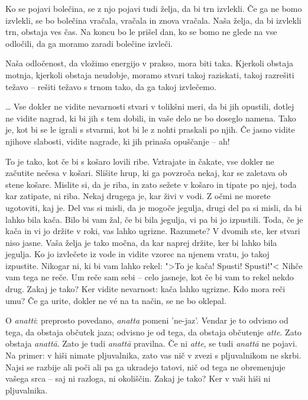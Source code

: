 Ko se pojavi bolečina, se z njo pojavi tudi želja, da bi trn izvlekli. Če ga ne bomo izvlekli, se bo bolečina vračala, vračala in znova vračala. Naša želja, da bi izvlekli trn, obstaja ves čas. Na koncu bo le prišel dan, ko se bomo ne glede na vse odločili, da ga moramo zaradi bolečine izvleči.

Naša odločenost, da vložimo energijo v prakso, mora biti taka. Kjerkoli obstaja motnja, kjerkoli obstaja neudobje, moramo stvari takoj raziskati, takoj razrešiti težavo – rešiti težavo s trnom tako, da ga takoj izvlečemo.

\clearpage


\ldots{} Vse dokler ne vidite nevarnosti stvari v tolikšni meri, da bi jih opustili, dotlej ne vidite nagrad, ki bi jih s tem dobili, in vaše delo ne bo doseglo namena. Tako je, kot bi se le igrali s stvarmi, kot bi le z nohti praskali po njih. Če jasno vidite njihove slabosti, vidite nagrade, ki jih prinaša opuščanje – ah!

To je tako, kot če bi s košaro lovili ribe. Vztrajate in čakate, vse dokler ne začutite nečesa v košari. Slišite hrup, ki ga povzroča nekaj, kar se zaletava ob stene košare. Mislite si, da je riba, in zato sežete v košaro in tipate po njej, toda kar zatipate, ni riba. Nekaj drugega je, kar živi v vodi. Z očmi ne morete ugotoviti, kaj je. Del vas si misli, da je mogoče jegulja, drugi del pa si misli, da bi lahko bila kača. Bilo bi vam žal, če bi bila jegulja, vi pa bi jo izpustili. Toda, če je kača in vi jo držite v roki, vas lahko ugrizne. Razumete? V dvomih ste, ker stvari niso jasne. Vaša želja je tako močna, da kar naprej držite, ker bi lahko bila jegulja. Ko jo izvlečete iz vode in vidite vzorec na njenem vratu, jo takoj izpustite. Nikogar ni, ki bi vam lahko rekel: ">To je kača! Spusti! Spusti!"< Nihče vam tega ne reče. Um reče sam sebi – celo jasneje, kot če bi vam to rekel nekdo drug. Zakaj je tako? Ker vidite nevarnost: kača lahko ugrizne. Kdo mora reči umu? Če ga urite, dokler ne vé na ta način, se ne bo oklepal.

\clearpage


O \emph{anatti}: preprosto povedano, \emph{anatta} pomeni 'ne-jaz'. Vendar je to odvisno od tega, da obstaja občutek jaza; odvisno je od tega, da obstaja občutenje \emph{atte}. Zato obstaja \emph{anattā}. Zato je tudi \emph{anattā} pravilna. Če ni \emph{atte}, se tudi \emph{anattā} ne pojavi. Na primer: v hiši nimate pljuvalnika, zato vas nič v zvezi s pljuvalnikom ne skrbi. Najsi se razbije ali poči ali pa ga ukradejo tatovi, nič od tega ne obremenjuje vašega srca – saj ni razloga, ni okoliščin. Zakaj je tako? Ker v vaši hiši ni pljuvalnika.

